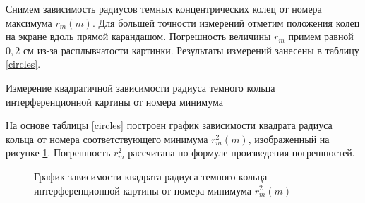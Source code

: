 \documentclass[12pt]{kiarticle}
\begin{document}
	Снимем зависимость радиусов темных концентрических колец от номера максимума $r_m(m)$. Для большей точности измерений отметим положения колец на экране вдоль прямой карандашом. Погрешность величины $r_m$ примем равной $0,2$ см из-за расплывчатости картинки. Результаты измерений занесены в таблицу \ref{circles}. 
	
	\begin{table}[h]
		\centering
		
		\caption{Измерение квадратичной зависимости радиуса темного кольца интерференционной картины от номера минимума}
		\label{circles}
	\end{table}	
	
	На основе таблицы \ref{circles} построен график зависимости квадрата радиуса кольца от номера соответствующего минимума $r_m^2(m)$, изображенный на рисунке \ref{r(m)}. Погрешность $r_m^2$ рассчитана по формуле произведения погрешностей. 
	
	\begin{figure}[h]
		\centering
		
		\datatable
		\xdef\coefA{\pgfplotstableregressiona} %
		\xdef\coefB{\pgfplotstableregressionb} %
		
		\caption{График зависимости квадрата радиуса темного кольца интерференционной картины от номера минимума $r_m^2(m)$}
		\label{r(m)}
	\end{figure}
	
\end{document}
